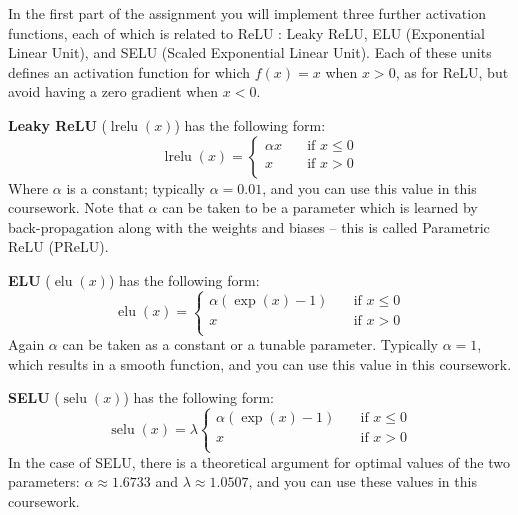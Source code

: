 \documentclass[11pt,]{article}
\DeclareMathOperator{\lrelu}{lrelu}
\DeclareMathOperator{\elu}{elu}
\DeclareMathOperator{\selu}{selu}
\begin{document}
In the first part of the assignment you will implement three further 
activation functions, each of which is related to ReLU \citep{nair2010rectified}:  Leaky ReLU, ELU (Exponential Linear Unit), and SELU (Scaled Exponential Linear Unit).   Each of these units defines an activation function for which $f(x) = x$ when $x>0$, as for ReLU, but avoid having a zero gradient when $x<0$.

\textbf{Leaky ReLU} ($\lrelu(x)$) \citep{maas2013rectifier} has the following form:
\begin{equation}
  \lrelu(x) =
     \begin{cases} 
      \alpha x     & \quad \text{if } x \leq  0 \\
      x       & \quad \text{if } x > 0 \\
    \end{cases} 
\end{equation}
Where $\alpha$ is a constant;  typically $\alpha=0.01$, and you can use this value in this coursework.  Note that $\alpha$ can be taken to be a parameter which is learned by back-propagation along with the weights and biases -- this is called Parametric ReLU (PReLU).  

\textbf{ELU} ($\elu(x)$) \citep{clevert2015fast} has the following form:
\begin{equation}
  \elu(x) =
     \begin{cases} 
      \alpha (\exp(x) - 1)     & \quad \text{if } x \leq  0 \\
      x       & \quad \text{if } x > 0 \\
    \end{cases} 
\end{equation}
Again $\alpha$ can be taken as a constant or a tunable parameter.  Typically $\alpha=1$, which results in a smooth function, and you can use this value in this coursework.

\textbf{SELU} ($\selu(x)$) \citep{klambauer2017self} has the following form:
\begin{equation}
  \selu(x) =
     \lambda \begin{cases} 
      \alpha (\exp(x) - 1)     & \quad \text{if } x \leq  0 \\
      x       & \quad \text{if } x > 0 \\
    \end{cases} 
\end{equation}
In the case of SELU, there is a theoretical argument for optimal values of the two parameters: $\alpha \approx 1.6733$ and $\lambda \approx 1.0507$, and you can use these values in this coursework.
\end{document}
